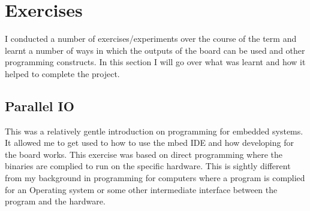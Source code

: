 \documentclass[a4paper,12pt]{scrartcl}
\begin{document}
	\section{Exercises}
	{
		I conducted a number of exercises/experiments over the course of the term and learnt a number of ways in which the outputs of the board can be used and other programming constructs. In this section I will go over what was learnt and how it helped to complete the project.
		\subsection{Parallel IO}
		{
			This was a relatively gentle introduction on programming for embedded systems. It allowed me to get used to how to use the mbed IDE and how developing for the board works. This exercise was based on direct programming where the binaries are complied to run on the specific hardware. This is sightly different from my background in programming for computers where a program is complied for an Operating system or some other intermediate interface between the program and the hardware. 
		}
}
\end{document}
